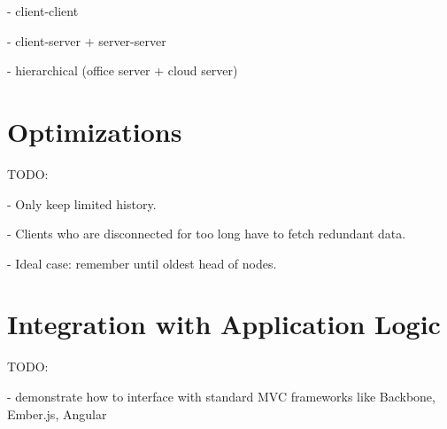 - client-client

- client-server + server-server

- hierarchical (office server + cloud server)

\section{Optimizations}

TODO:

- Only keep limited history.

- Clients who are disconnected for too long have to fetch redundant data.

- Ideal case: remember until oldest head of nodes.

\section{Integration with Application Logic}

TODO:

- demonstrate how to interface with standard MVC frameworks like Backbone, Ember.js, Angular
